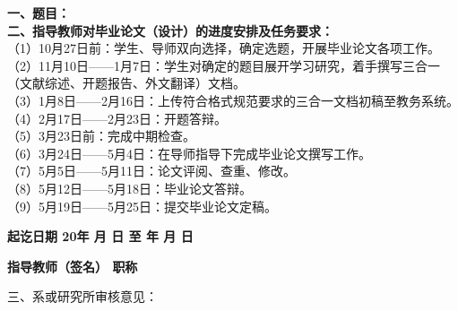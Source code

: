 \cleardoublepage{}

{
    \bfseries
    \noindent 一、题目：\Title\\
    \noindent 二、指导教师对毕业论文（设计）的进度安排及任务要求：\\
}
（1）10月27日前：学生、导师双向选择，确定选题，开展毕业论文各项工作。 \\
（2）11月10日——1月7日：学生对确定的题目展开学习研究，着手撰写三合一（文献综述、开题报告、外文翻译）文档。\\
（3）1月8日——2月16日：上传符合格式规范要求的三合一文档初稿至教务系统。 \\
（4）2月17日——2月23日：开题答辩。 \\
（5）3月23日前：完成中期检查。 \\
（6）3月24日——5月4日：在导师指导下完成毕业论文撰写工作。\\
（7）5月5日——5月11日：论文评阅、查重、修改。 \\
（8）5月12日——5月18日：毕业论文答辩。 \\
（9）5月19日——5月25日：提交毕业论文定稿。

{     \bfseries
    \noindent 起讫日期 20\quad 年 \quad  月 \quad  日 \quad 至 \quad  年 \quad  月 \quad 日
    \begin{flushright}
        \bfseries {}
            指导教师（签名） \underline{} 职称 \underline{}
    \end{flushright}

    \noindent 三、系或研究所审核意见：\\

    \mbox{} \vfill
    \signature{负责人（签名）}
}
